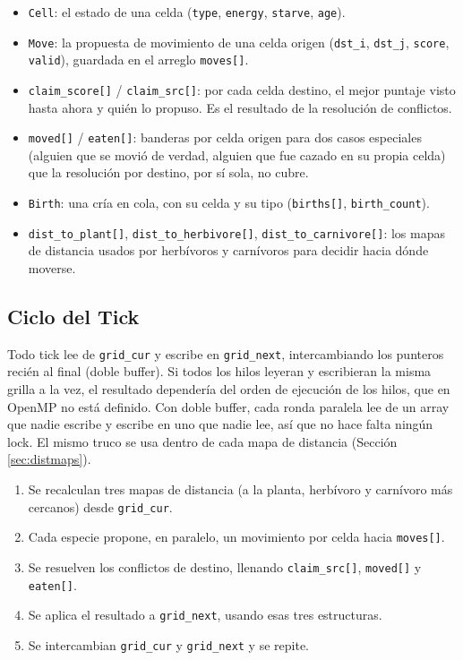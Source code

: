 \documentclass[11pt]{article}
\begin{document}
\begin{itemize}
    \item \texttt{Cell}: el estado de una celda (\texttt{type},
    \texttt{energy}, \texttt{starve}, \texttt{age}).
    \item \texttt{Move}: la propuesta de movimiento de una celda origen
    (\texttt{dst\_i}, \texttt{dst\_j}, \texttt{score}, \texttt{valid}),
    guardada en el arreglo \texttt{moves[]}.
    \item \texttt{claim\_score[]} / \texttt{claim\_src[]}: por cada celda
    destino, el mejor puntaje visto hasta ahora y quién lo propuso. Es el
    resultado de la resolución de conflictos.
    \item \texttt{moved[]} / \texttt{eaten[]}: banderas por celda origen
    para dos casos especiales (alguien que se movió de verdad, alguien
    que fue cazado en su propia celda) que la resolución por destino, por
    sí sola, no cubre.
    \item \texttt{Birth}: una cría en cola, con su celda y su tipo
    (\texttt{births[]}, \texttt{birth\_count}).
    \item \texttt{dist\_to\_plant[]}, \texttt{dist\_to\_herbivore[]},
    \texttt{dist\_to\_carnivore[]}: los mapas de distancia usados por
    herbívoros y carnívoros para decidir hacia dónde moverse.
\end{itemize}

\subsection{Ciclo del Tick}

Todo tick lee de \texttt{grid\_cur} y escribe en \texttt{grid\_next},
intercambiando los punteros recién al final (doble buffer). Si todos los
hilos leyeran y escribieran la misma grilla a la vez, el resultado
dependería del orden de ejecución de los hilos, que en OpenMP no está
definido. Con doble buffer, cada ronda paralela lee de un array que nadie
escribe y escribe en uno que nadie lee, así que no hace falta ningún
lock. El mismo truco se usa dentro de cada mapa de distancia (Sección
\ref{sec:distmaps}).

\begin{enumerate}
    \item Se recalculan tres mapas de distancia (a la planta,
    herbívoro y carnívoro más cercanos) desde \texttt{grid\_cur}.
    \item Cada especie propone, en paralelo, un movimiento por celda
    hacia \texttt{moves[]}.
    \item Se resuelven los conflictos de destino, llenando
    \texttt{claim\_src[]}, \texttt{moved[]} y \texttt{eaten[]}.
    \item Se aplica el resultado a \texttt{grid\_next}, usando esas tres
    estructuras.
    \item Se intercambian \texttt{grid\_cur} y \texttt{grid\_next} y se
    repite.
\end{enumerate}
\end{document}
